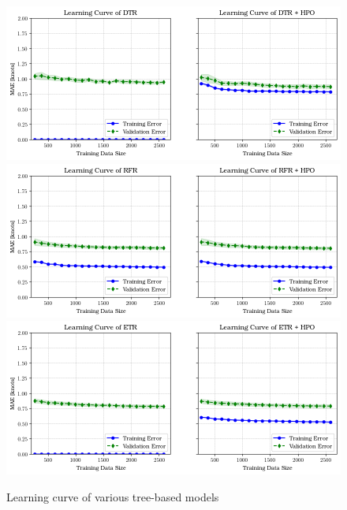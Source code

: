 \begin{figure}
    \centering
    \includegraphics[width=.95\textwidth]{02_figures/learning_curve_dtr_mae.png}\\
    \includegraphics[width=.95\textwidth]{02_figures/learning_curve_rfr_mae.png}\\
    \includegraphics[width=.95\textwidth]{02_figures/learning_curve_etr_mae.png}
    \caption{Learning curve of various tree-based models}
    \label{fig:learn_curve_TREE_MAE}
\end{figure}


